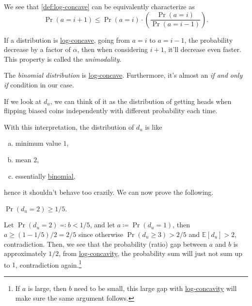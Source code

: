 We see that \autoref{def:log-concave} can be equivalently characterize as
\[
	\Pr(a=i+1) \leq \Pr(a=i) \cdot \left( \frac{\Pr(a=i)}{\Pr(a=i-1)} \right).
\]

\begin{intuition}
	If a distribution is \hyperref[def:log-concave]{log-concave}, going from \(a=i\) to \(a=i-1\), the probability decrease by a factor of \(\alpha\), then when considering \(i+1\), it'll decrease even faster. This property is called the \emph{unimodality}.
\end{intuition}

\begin{eg}
	The \emph{binomial distribution} is \hyperref[def:log-concave]{log-concave}. Furthermore, it's almost an \emph{if and only if} condition in our case.
\end{eg}
\begin{explanation}
	If we look at \(d_u\), we can think of it as the distribution of getting heads when flipping biased coins independently with different probability each time.
\end{explanation}

With this interpretation, the distribution of \(d_u\) is like
\begin{enumerate}[(a)]
	\item minimum value \(1\),
	\item mean \(2\),
	\item essentially \href{https://en.wikipedia.org/wiki/Binomial_distribution}{binomial},
\end{enumerate}
hence it shouldn't behave too crazily. We can now prove the following.

\begin{claim}
	\(\Pr(d_u = 2) \geq 1 / 5\).
\end{claim}
\begin{explanation}
	Let \(\Pr(d_u = 2) \eqqcolon b < 1 / 5\), and let \(a\coloneqq \Pr(d_u = 1)\), then \(a \geq (1 - 1 / 5) / 2 = 2 / 5\) since otherwise \(\Pr(d_u \geq 3) > 2 / 5\) and \(\mathbb{E}_{}\left[ d_u \right] > 2 \), contradiction. Then, we see that the probability (ratio) gap between \(a\) and \(b\) is approximately \(1 / 2\), from \hyperref[def:log-concave]{log-concavity}, the probability sum will just not sum up to \(1\), contradiction again.\footnote{If \(a\) is large, then \(b\) need to be small, this large gap with \hyperref[def:log-concave]{log-concavity} will make sure the same argument follows.}
\end{explanation}



